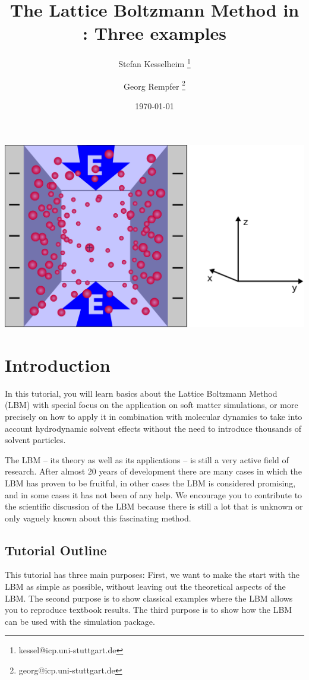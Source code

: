 \renewcommand{\d}{\mathrm d}
\subject{ESPResSo Tutorial}
\title{The Lattice Boltzmann Method in \ES{}: Three examples } \author{ Stefan Kesselheim \thanks{\ttfamily 
kessel@icp.uni-stuttgart.de}  \and  Georg Rempfer \thanks{\ttfamily 
georg@icp.uni-stuttgart.de}}
\date{\today}
\publishers{Institute for Computational Physics, Stuttgart University}
\maketitle 
\begin{center}
  \includegraphics[width=0.5\columnwidth]{../figs/schlitzpore_3d.pdf}
\end{center}
\tableofcontents



\chapter{Introduction}
In this tutorial, you will learn basics about the 
Lattice Boltzmann Method (LBM) with special focus on the application
on soft matter simulations, or more precisely on how to apply it 
in combination with molecular dynamics to take into account 
hydrodynamic solvent effects without the need to introduce
thousands of solvent particles. 

The LBM -- its theory as well as its applications -- is 
still a very active field of research. After almost 20 years
of development there are many cases in which the LBM has proven
to be fruitful, in other cases the LBM is considered promising,
and in some cases it has not been of any help. We
encourage you to contribute to the scientific discussion 
of the LBM because there is still a lot 
that is unknown or only vaguely known about this fascinating
method. 

\section*{Tutorial Outline}
This tutorial has three main purposes: First, we want to make the start
with the LBM as simple as possible, without leaving out the theoretical
aspects of the LBM.
The second purpose is to show classical examples where the LBM allows 
you to reproduce textbook results.
The third purpose is to show how the LBM can be used with the
\ES{} simulation package. 

